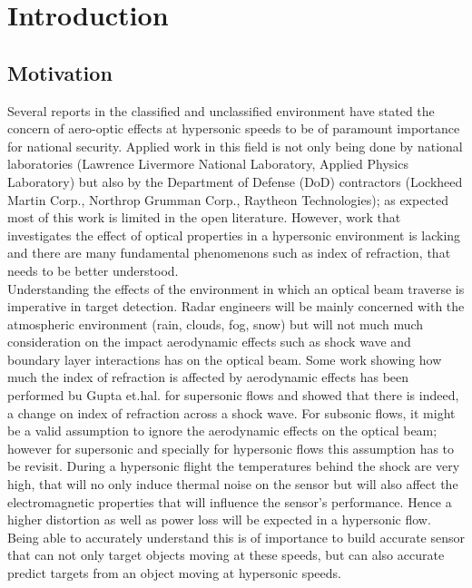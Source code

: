 \chapter{Introduction\label{ch:chapter1}}
    \section{Motivation\label{chS:motivation}}
        Several reports in the classified and unclassified
        \cite{Jones2009, ChiefScientistAirForce2010} environment have stated
        the concern of aero-optic effects at hypersonic speeds to be of
        paramount importance for national security. Applied work in this field
        is not only being done by national laboratories (Lawrence Livermore
        National Laboratory, Applied Physics Laboratory) but also by the
        Department of Defense (DoD) contractors (Lockheed Martin Corp.,
        Northrop Grumman Corp., Raytheon Technologies); as expected most of
        this work is limited in the open literature. However, work that investigates the effect of optical properties in
        a hypersonic environment is lacking and there are many fundamental
        phenomenons such as index of refraction, that needs to be better
        understood. \\

        Understanding the effects of the environment in which an optical beam traverse is imperative in target detection. Radar engineers will be mainly concerned with the atmospheric environment (rain, clouds, fog, snow) but will not much much consideration on the impact aerodynamic effects such as shock wave and boundary layer interactions has on the optical beam. Some work showing how much the index of refraction is affected by aerodynamic effects has been performed bu Gupta et.hal. \cite{Gupta2020} for supersonic flows and showed that there is indeed, a change on index of refraction across a shock wave. For subsonic flows, it might be a valid assumption to ignore the aerodynamic effects on the optical beam; however for supersonic and specially for hypersonic flows this assumption has to be revisit. During a hypersonic flight the temperatures behind the shock are very high, that will no only induce thermal noise on the sensor but will also affect the electromagnetic properties that will influence the sensor's performance. Hence a higher distortion as well as power loss will be expected in a hypersonic flow. Being able to accurately understand this is of importance to build accurate sensor that can not only target objects moving at these speeds, but can also accurate predict targets from an object moving at hypersonic speeds.  \\

